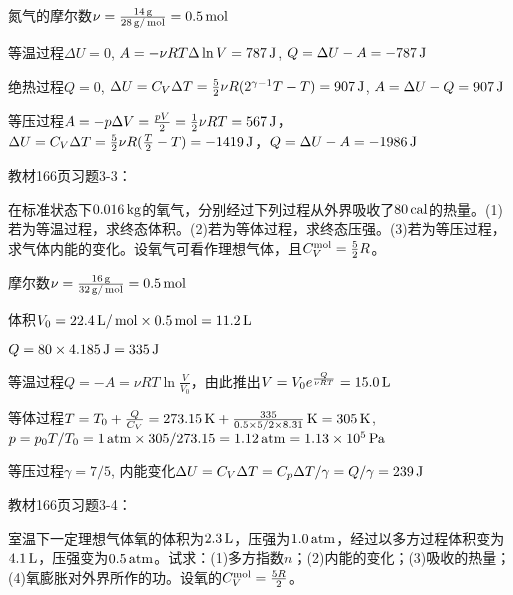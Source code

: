 \documentclass[CJK]{beamer}
\begin{document}
\begin{frame}
  \bch
  {\small
  氮气的摩尔数$\nu = \frac{14\,\mathrm{g}}{28\,\mathrm{g}/\,\mathrm{mol}} = 0.5\,\mathrm{mol}$
  \bitem
\item{等温过程$\Delta U = 0$, $A = -\nu R T\Delta \ln V = 787\,\mathrm{J}$, $Q = \Delta U - A = - 787\,\mathrm{J}$
}
\item{绝热过程$Q=0$, $\Delta U = C_V \Delta T = \frac{5}{2}\nu R (2^{\gamma-1}T -T) = 907\,\mathrm{J}$, $A = \Delta U - Q = 907\,\mathrm{J}$}
\item{等压过程$A = -p\Delta V = \frac{pV}{2} = \frac{1}{2}\nu R T = 567\,\mathrm{J}$，$\Delta U = C_V \Delta T = \frac{5}{2}\nu R (\frac{T}{2}-T) = -1419\,\mathrm{J}$，$Q = \Delta U - A = -1986 \,\mathrm{J}$}
  \eitem
  }
  \ech
\end{frame}

\begin{frame}
  \chtitle{\proid   (\stwo)}
  \bch
  教材166页习题3-3：

  
  在标准状态下$0.016\,\mathrm{kg}$的氧气，分别经过下列过程从外界吸收了$80\,\mathrm{cal}$的热量。(1)若为等温过程，求终态体积。(2)若为等体过程，求终态压强。(3)若为等压过程，求气体内能的变化。设氧气可看作理想气体，且$C_V^{\rm mol} = \frac{5}{2}R$。
  \ech
\end{frame}

\begin{frame}
  \bch
  摩尔数$\nu = \frac{16\,\mathrm{g}}{32\,\mathrm{g}/\,\mathrm{mol}} = 0.5\,\mathrm{mol}$
  
  体积$V_0 = 22.4\,\mathrm{L}/\,\mathrm{mol} \times 0.5\,\mathrm{mol} = 11.2\,\mathrm{L}$

  $Q = 80\times 4.185 \,\mathrm{J} = 335\,\mathrm{J}$
  \bitem
\item{等温过程$Q = -A = \nu RT \ln\frac{V}{V_0}$，由此推出$V = V_0e^{\frac{Q}{\nu RT}} = 15.0\,\mathrm{L}$}
\item{等体过程$T = T_0+ \frac{Q}{C_V} = 273.15\,\mathrm{K} + \frac{335}{0.5\times 5/2\times 8.31}\,\mathrm{K} = 305\,\mathrm{K}$, $p = p_0 T/T_0 = 1\,\mathrm{atm} \times 305/273.15 = 1.12 \,\mathrm{atm} = 1.13\times 10^5\,\mathrm{Pa}$}
\item{等压过程$\gamma = 7/5$, 内能变化$\Delta U = C_V\Delta T = C_p\Delta T /\gamma = Q/\gamma = 239\,\mathrm{J}$}
  \eitem
  
  \ech
\end{frame}

\begin{frame}
  \chtitle{\proid (\stwo)}
  \bch
  教材166页习题3-4：

  室温下一定理想气体氧的体积为$2.3\,\mathrm{L}$，压强为$1.0\,\mathrm{atm}$，经过以多方过程体积变为$4.1\,\mathrm{L}$，压强变为$0.5\,\mathrm{atm}$。试求：(1)多方指数$n$；(2)内能的变化；(3)吸收的热量；(4)氧膨胀对外界所作的功。设氧的$C_V^{\rm mol}=\frac{5R}{2}$。
  \ech
\end{frame}
\end{document}
